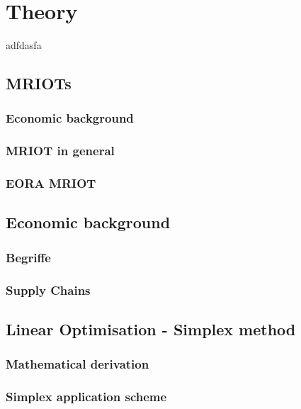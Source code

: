 

\chapter{Theory}
adfdasfa


\section{MRIOTs}

\subsection{Economic background}

\subsection{MRIOT in general}


\subsection{EORA MRIOT}

\section{Economic background}


\subsection{Begriffe}


\subsection{Supply Chains}


\section{Linear Optimisation - Simplex method}


\subsection{Mathematical derivation}


\subsection{Simplex application scheme}

